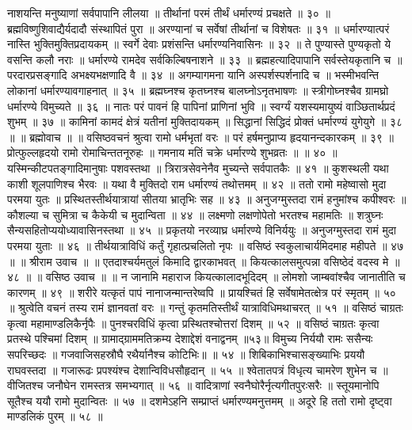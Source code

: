 नाशयन्ति मनुष्याणां सर्वपापानि लीलया ॥
तीर्थानां परमं तीर्थं धर्मारण्यं प्रचक्षते ॥ ३० ॥
ब्रह्मविष्णुशिवाद्यैर्यदादौ संस्थापितं पुरा ॥
अरण्यानां च सर्वेषां तीर्थानां च विशेषतः ॥ ३१ ॥
धर्मारण्यात्परं नास्ति भुक्तिमुक्तिप्रदायकम् ॥
स्वर्गे देवाः प्रशंसन्ति धर्मारण्यनिवासिनः ॥ ३२ ॥
ते पुण्यास्ते पुण्यकृतो ये वसन्ति कलौ नराः ॥
धर्मारण्ये रामदेव सर्वकिल्बिषनाशने ॥ ३३ ॥
ब्रह्महत्यादिपापानि सर्वस्तेयकृतानि च ॥
परदारप्रसङ्गादि अभक्ष्यभक्षणादि वै ॥ ३४ ॥
अगम्यागमना यानि अस्पर्शस्पर्शनादि च ॥
भस्मीभवन्ति लोकानां धर्मारण्यावगाहनात् ॥ ३५ ॥
ब्रह्मघ्नश्च कृतघ्नश्च बालघ्नोऽनृतभाषणः ॥
स्त्रीगोघ्नश्चैव ग्रामघ्रो धर्मारण्ये विमुच्यते ॥ ३६ ॥
नातः परं पावनं हि पापिनां प्राणिनां भुवि ॥
स्वर्ग्यं यशस्यमायुष्यं वाञ्छितार्थप्रदं शुभम् ॥ ३७ ॥
कामिनां कामदं क्षेत्रं यतीनां मुक्तिदायकम् ॥
सिद्धानां सिद्धिदं प्रोक्तं धर्मारण्यं युगेयुगे ॥ ३८ ॥
॥ ब्रह्मोवाच ॥ ॥
वसिष्ठवचनं श्रुत्वा रामो धर्मभृतां वरः ॥
परं हर्षमनुप्राप्य हृदयानन्दकारकम् ॥ ३९ ॥
प्रोत्फुल्लहृदयो रामो रोमाचिन्ततनूरुहः ॥
गमनाय मतिं चक्रे धर्मारण्ये शुभव्रतः ॥ ॥ ४० ॥
यस्मिन्कीटपतङ्गादिमानुषाः पशवस्तथा ॥
त्रिरात्रसेवनेनैव मुच्यन्ते सर्वपातकैः ॥ ४१ ॥
कुशस्थली यथा काशी शूलपाणिश्च भैरवः ॥
यथा वै मुक्तिदो राम धर्मारण्यं तथोत्तमम् ॥ ४२ ॥
ततो रामो महेष्वासो मुदा परमया युतः ॥
प्रस्थितस्तीर्थयात्रायां सीतया भ्रातृभिः सह ॥ ४३ ॥
अनुजग्मुस्तदा रामं हनुमांश्च कपीश्वरः ॥
कौशल्या च सुमित्रा च कैकेयी च मुदान्विता ॥ ४४ ॥
लक्ष्मणो लक्षणोपेतो भरतश्च महामतिः ॥
शत्रुघ्नः सैन्यसहितोप्ययोध्यावासिनस्तथा ॥ ४५ ॥
प्रकृतयो नरव्याघ्र धर्मारण्ये विनिर्ययुः ॥
अनुजग्मुस्तदा रामं मुदा परमया युताः ॥ ४६ ॥
तीर्थयात्राविधिं कर्तुं गृहात्प्रचलितो नृपः ॥
वसिष्ठं स्वकुलाचार्यमिदमाह महीपते ॥ ४७ ॥
॥ श्रीराम उवाच ॥ ॥
एतदाश्चर्यमतुलं किमादि द्वारकाभवत् ॥
कियत्कालसमुत्पन्ना वसिष्ठेदं वदस्व मे ॥ ४८ ॥
॥ वसिष्ठ उवाच ॥ ॥
न जानामि महाराज कियत्कालादभूदिदम् ॥
लोमशो जाम्बवांश्चैव जानातीति च कारणम् ॥ ४९ ॥
शरीरे यत्कृतं पापं नानाजन्मान्तरेष्वपि ॥
प्रायश्चितं हि सर्वेषामेतत्क्षेत्र परं स्मृतम् ॥ ५० ॥
श्रुत्वेति वचनं तस्य रामं ज्ञानवतां वरः ॥
गन्तुं कृतमतिस्तीर्थं यात्राविधिमथाचरत् ॥ ५१ ॥
वसिष्ठं चाग्रतः कृत्वा महामाण्डलिकैर्नृपैः ॥
पुनश्चरविधिं कृत्वा प्रस्थितश्चोत्तरां दिशम् ॥ ५२ ॥
वसिष्ठं चाग्रतः कृत्वा प्रतस्थे पश्चिमां दिशम् ॥
ग्रामाद्ग्राममतिक्रम्य देशाद्देशं वनाद्वनम् ॥५३॥
विमुच्य निर्ययौ रामः ससैन्यः सपरिच्छदः ॥
गजवाजिसहस्रौघै रथैर्यानैश्च कोटिभिः॥ ॥ ५४ ॥
शिबिकाभिश्चासङ्ख्याभिः प्रययौ राघवस्तदा ॥
गजारूढः प्रपश्यंश्च देशान्विविधसौहृदान् ॥ ५५ ॥
श्वेतातपत्रं विधृत्य चामरेण शुभेन च ॥
वीजितश्च जनौघेन रामस्तत्र समभ्यगात् ॥ ५६ ॥
वादित्राणां स्वनैघोरैर्नृत्यगीतपुरःसरैः ॥
स्तूयमानोपि सूतैश्च ययौ रामो मुदान्वितः ॥ ५७ ॥
दशमेऽहनि सम्प्राप्तं धर्मारण्यमनुत्तमम् ॥
अदूरे हि ततो रामो दृष्ट्वा माण्डलिकं पुरम् ॥ ५८ ॥
